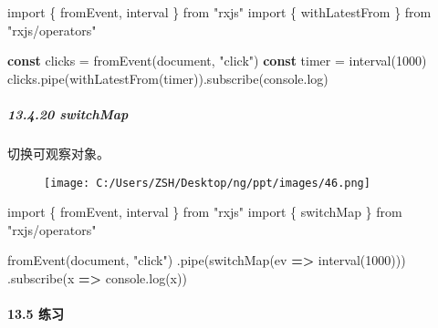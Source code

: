 \documentclass[
]{article}
\newenvironment{Shaded}{}{}
\newcommand{\BuiltInTok}[1]{#1}
\newcommand{\DecValTok}[1]{\textcolor[rgb]{0.25,0.63,0.44}{#1}}
\newcommand{\FunctionTok}[1]{\textcolor[rgb]{0.02,0.16,0.49}{#1}}
\newcommand{\ImportTok}[1]{#1}
\newcommand{\KeywordTok}[1]{\textcolor[rgb]{0.00,0.44,0.13}{\textbf{#1}}}
\newcommand{\NormalTok}[1]{#1}
\newcommand{\OperatorTok}[1]{\textcolor[rgb]{0.40,0.40,0.40}{#1}}
\newcommand{\StringTok}[1]{\textcolor[rgb]{0.25,0.44,0.63}{#1}}
\begin{document}
\begin{Shaded}
\begin{Highlighting}[]
\ImportTok{import}\NormalTok{ \{ fromEvent}\OperatorTok{,}\NormalTok{ interval \} }\ImportTok{from} \StringTok{"rxjs"}
\ImportTok{import}\NormalTok{ \{ withLatestFrom \} }\ImportTok{from} \StringTok{"rxjs/operators"}

\KeywordTok{const}\NormalTok{ clicks }\OperatorTok{=} \FunctionTok{fromEvent}\NormalTok{(}\BuiltInTok{document}\OperatorTok{,} \StringTok{"click"}\NormalTok{)}
\KeywordTok{const}\NormalTok{ timer }\OperatorTok{=} \FunctionTok{interval}\NormalTok{(}\DecValTok{1000}\NormalTok{)}
\NormalTok{clicks}\OperatorTok{.}\FunctionTok{pipe}\NormalTok{(}\FunctionTok{withLatestFrom}\NormalTok{(timer))}\OperatorTok{.}\FunctionTok{subscribe}\NormalTok{(}\BuiltInTok{console}\OperatorTok{.}\FunctionTok{log}\NormalTok{)}
\end{Highlighting}
\end{Shaded}

\hypertarget{13420-switchmap}{%
\subparagraph{13.4.20 switchMap}\label{13420-switchmap}}

切换可观察对象。

\begin{figure}
\centering
\texttt{[image: C:/Users/ZSH/Desktop/ng/ppt/images/46.png]}
\caption{}
\end{figure}

\begin{Shaded}
\begin{Highlighting}[]
\ImportTok{import}\NormalTok{ \{ fromEvent}\OperatorTok{,}\NormalTok{ interval \} }\ImportTok{from} \StringTok{"rxjs"}
\ImportTok{import}\NormalTok{ \{ switchMap \} }\ImportTok{from} \StringTok{"rxjs/operators"}

\FunctionTok{fromEvent}\NormalTok{(}\BuiltInTok{document}\OperatorTok{,} \StringTok{"click"}\NormalTok{)}
  \OperatorTok{.}\FunctionTok{pipe}\NormalTok{(}\FunctionTok{switchMap}\NormalTok{(ev }\KeywordTok{=\textgreater{}} \FunctionTok{interval}\NormalTok{(}\DecValTok{1000}\NormalTok{)))}
  \OperatorTok{.}\FunctionTok{subscribe}\NormalTok{(x }\KeywordTok{=\textgreater{}} \BuiltInTok{console}\OperatorTok{.}\FunctionTok{log}\NormalTok{(x))}
\end{Highlighting}
\end{Shaded}

\hypertarget{135-ux7ec3ux4e60}{%
\paragraph{13.5 练习}\label{135-ux7ec3ux4e60}}
\end{document}

